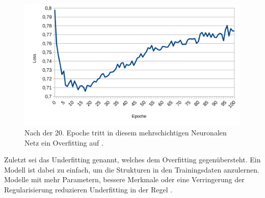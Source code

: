 \documentclass[11pt,bibliography=totocnumbered]{scrartcl}
\begin{document}
\begin{figure}[H] 
	\centering
	\includegraphics[width=1.0\textwidth]{mlp_5_loss}
	\caption[Overfitting in einem mehrschichtigen Neuronalen Netz]{Nach der 20. Epoche tritt in diesem mehrschichtigen Neuronalen Netz ein Overfitting auf \cite[S.14]{BA}.}
	\label{fig:mlp_overfitting}
\end{figure}
Zuletzt sei das Underfitting genannt, welches dem Overfitting gegenübersteht. Ein Modell ist dabei zu einfach, um die Strukturen in den Trainingsdaten anzulernen. Modelle mit mehr Parametern, bessere Merkmale oder eine Verringerung der Regularisierung reduzieren Underfitting in der Regel \cite[S.29]{MACHINE_LEARNING}\cite[S.14]{BA}.
\end{document}
